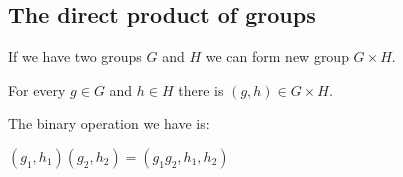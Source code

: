 
\subsection{The direct product of groups}

If we have two groups \(G\) and \(H\) we can form new group \(G\times H\).

For every \(g\in G\) and \(h\in H\) there is \((g,h)\in G\times H\).

The binary operation we have is:

\((g_1, h_1)(g_2,h_2)=(g_1g_2,h_1,h_2)\)

